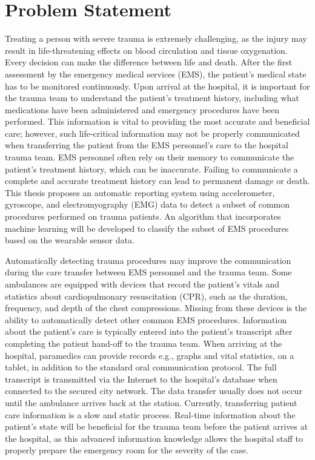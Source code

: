 
\chapter{Problem Statement}
\label{ch:Problem-Statement}

Treating a person with severe trauma is extremely challenging, as the injury may result in life-threatening effects on blood circulation and tissue oxygenation. Every decision can make the difference between life and death. After the first assessment by the emergency medical services (\gls{EMS}), the patient's medical state has to be monitored continuously. Upon arrival at the hospital, it is important for the trauma team to understand the patient's treatment history, including what medications have been administered and emergency procedures have been performed. This information is vital to providing the most accurate and beneficial care; however, such life-critical information may not be properly communicated when transferring the patient from the \gls{EMS} personnel's care to the hospital trauma team. \gls{EMS} personnel often rely on their memory to communicate the patient's treatment history, which can be inaccurate. Failing to communicate a complete and accurate treatment history can lead to permanent damage or death. This thesis proposes an automatic reporting system using accelerometer, gyroscope, and electromyography (\gls{EMG}) data to detect a subset of common procedures performed on trauma patients. An algorithm that incorporates machine learning will be developed to classify the subset of \gls{EMS} procedures based on the wearable sensor data.
\par Automatically detecting trauma procedures may improve the communication during the care transfer between EMS personnel and the trauma team. Some ambulances are equipped with devices that record the patient's vitals and statistics about cardiopulmonary resuscitation (\gls{CPR}), such as the duration, frequency, and depth of the chest compressions. Missing from these devices is the ability to automatically detect other common EMS procedures. Information about the patient's care is typically entered into the patient's transcript after completing the patient hand-off to the trauma team. When arriving at the hospital, paramedics can provide records e.g., graphs and vital statistics, on a tablet, in addition to the standard oral communication protocol. The full transcript is transmitted via the Internet to the hospital's database when connected to the secured city network. The data transfer usually does not occur until the ambulance arrives back at the station. Currently, transferring patient care information is a slow and static process. Real-time information about the patient's state will be beneficial for the trauma team before the patient arrives at the hospital, as this advanced information knowledge allows the hospital staff to properly prepare the emergency room for the severity of the case.
